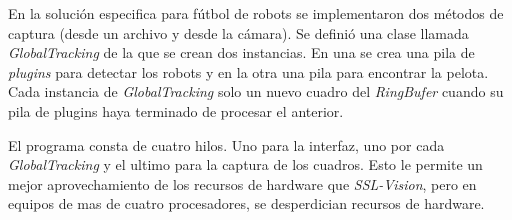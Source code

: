 En la solución especifica para fútbol de robots se implementaron dos métodos de
captura (desde un archivo y desde la cámara). Se definió una clase llamada
\emph{GlobalTracking} de la que se crean dos instancias. En una se crea una pila
de \emph{plugins} para detectar los robots y en la otra una pila para encontrar
la pelota. Cada instancia de \emph{GlobalTracking} solo un nuevo cuadro del
\emph{RingBufer} cuando su pila de plugins haya terminado de procesar el
anterior.


El programa consta de cuatro hilos. Uno para la interfaz, uno por cada
\emph{GlobalTracking} y el ultimo para la captura de los cuadros. Esto le
permite un mejor aprovechamiento de los recursos de hardware que
\emph{SSL-Vision}, pero en equipos de mas de cuatro procesadores, se
desperdician recursos de hardware.


